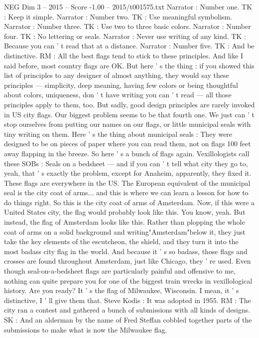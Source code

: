 \begin{textsample}{NEG Dim 3 – 2015 – Score -1.00 – 2015/t001575.txt}
Narrator : Number one.
TK : Keep it simple.
Narrator : Number two.
TK : Use meaningful symbolism.
Narrator : Number three.
TK : Use two to three basic colors.
Narrator : Number four.
TK : No lettering or seals.
Narrator : Never use writing of any kind.
TK : Because you can ' t read that at a distance.
Narrator : Number five.
TK : And be distinctive.
RM : All the best flags tend to stick to these principles.
And like I said before, most country flags are OK.
But here ' s the thing : if you showed this list of principles to any designer of almost anything, they would say these principles — simplicity, deep meaning, having few colors or being thoughtful about colors, uniqueness, don ' t have writing you can ' t read — all those principles apply to them, too.
But sadly, good design principles are rarely invoked in US city flags.
Our biggest problem seems to be that fourth one.
We just can ' t stop ourselves from putting our names on our flags, or little municipal seals with tiny writing on them.
Here ' s the thing about municipal seals : They were designed to be on pieces of paper where you can read them, not on flags 100 feet away flapping in the breeze.
So here ' s a bunch of flags again.
Vexillologists call these SOBs : Seals on a bedsheet — and if you can ' t tell what city they go to, yeah, that ' s exactly the problem, except for Anaheim, apparently, they fixed it.
These flags are everywhere in the US.
The European equivalent of the municipal seal is the city coat of arms... and this is where we can learn a lesson for how to do things right.
So this is the city coat of arms of Amsterdam.
Now, if this were a United States city, the flag would probably look like this.
You know, yeah.
But instead, the flag of Amsterdam looks like this.
Rather than plopping the whole coat of arms on a solid background and writing"Amsterdam"below it, they just take the key elements of the escutcheon, the shield, and they turn it into the most badass city flag in the world.
And because it ' s so badass, those flags and crosses are found throughout Amsterdam, just like Chicago, they ' re used.
Even though seal-on-a-bedsheet flags are particularly painful and offensive to me, nothing can quite prepare you for one of the biggest train wrecks in vexillological history.
Are you ready?
It ' s the flag of Milwaukee, Wisconsin.
I mean, it ' s distinctive, I ' ll give them that.
Steve Kodis : It was adopted in 1955.
RM : The city ran a contest and gathered a bunch of submissions with all kinds of designs.
SK : And an alderman by the name of Fred Steffan cobbled together parts of the submissions to make what is now the Milwaukee flag.

\end{textsample}
